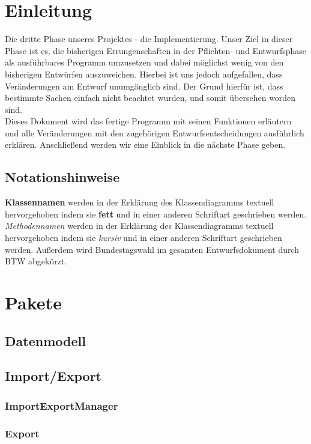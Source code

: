 \documentclass[12pt,a4paper,titlepage]{article}
\newcommand{\myma}{\fontfamily{pcr}\selectfont \textbf}
\newcommand{\mymo}{\fontfamily{pcr}\selectfont \textit}
\begin{document}
\section{Einleitung}
Die dritte Phase unseres Projektes - die Implementierung. Unser Ziel in dieser Phase ist es, die bisherigen Errungenschaften in der Pflichten- und Entwurfsphase als ausführbares Programm umzusetzen und dabei möglichst wenig von den bisherigen Entwürfen auszuweichen. Hierbei ist uns jedoch aufgefallen, dass Veränderungen am Entwurf unumgänglich sind. Der Grund hierfür ist, dass bestimmte Sachen einfach nicht beachtet wurden, und somit übersehen worden sind. \\
Dieses Dokument wird das fertige Programm mit seinen Funktionen erläutern und alle Veränderungen mit den zugehörigen Entwurfsentscheidungen ausführlich erklären. Anschließend werden wir eine Einblick in die nächste Phase geben. \\

\subsection{Notationshinweise}
{\myma{Klassennamen}} werden in der Erklärung des Klassendiagramms textuell hervorgehoben indem sie \textbf{fett} und in einer anderen Schriftart geschrieben werden.\newline
{\mymo{Methodennamen}} werden in der Erklärung des Klassendiagramms textuell hervorgehoben indem sie \textit{kursiv} und in einer anderen Schriftart geschrieben werden.\newline
Außerdem wird Bundestagswahl im gesamten Entwurfsdokument durch BTW abgekürzt.
\newpage

\section{Pakete}

	\subsection{Datenmodell}

	\subsection{Import/Export}
		\subsubsection{ImportExportManager}		
		\subsubsection{Export}
\end{document}
